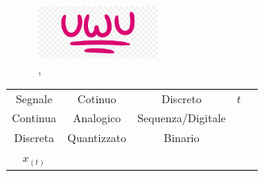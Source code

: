 \begin{itemize}
{\begin{itemize}
                    \end{itemize}
                    \begin{figure}[h]
                        \centering
                        \includegraphics[width=4cm]{media/uwu.png}
                        \caption{\color{purple}{ampiezza continua}, \color{blue}{ampiezza discreta}}
                        \label{fig:dominio dell'ampiezza}
                    \end{figure}
            }
        \end{itemize}
        \begin{table}[h]
            \centering
            \begin{tabular}{c|cccc}
            Segnale   & \multicolumn{1}{c|}{Cotinuo}     & Discreto          & $t$ &  \\ \cline{1-4}
            Continua  & \multicolumn{1}{c|}{Analogico}   & Sequenza/Digitale &       &  \\ \cline{1-3}
            Discreta  & \multicolumn{1}{c|}{Quantizzato} & Binario           &       &  \\
            $x_{(t)}$ &                                  &                   &       & 
            \end{tabular}
        \end{table}
